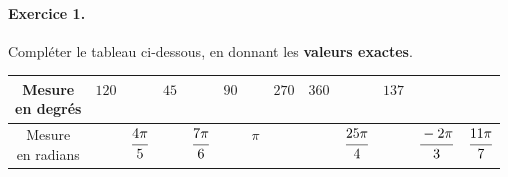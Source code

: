 \documentclass[11pt]{article}
\begin{document}

%

\paragraph{Exercice 1.}
Compléter le tableau ci-dessous, en donnant les \textbf{valeurs exactes}.
\def\arraystretch{2}
\begin{center}
\begin{tabular}{|c|c|c|c|c|c|c|c|c|c|c|c|c|}
  \hline
  \makecell{Mesure\\en degrés} & $120$ & & $45$ &  & $90$ & \phantom{$180$} &
  $270$ & $360$ & & $137$ & & \\
  \hline
  \makecell{Mesure\\en radians} & & $\cfrac{4\pi}{5}$ & & $\cfrac{7\pi}{6}$ & &
  $\pi$ & & & $\cfrac{25\pi}{4}$ & & $\cfrac{-2\pi}{3}$ & $\cfrac{11\pi}{7}$\\
  \hline
\end{tabular}
\end{center}
\end{document}
